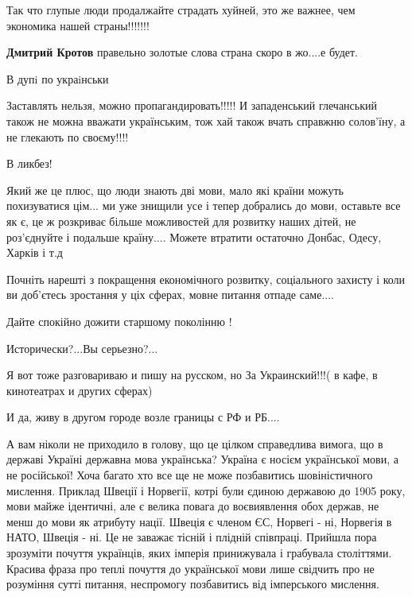 \begin{itemize}
Так что глупые люди продалжайте страдать хуйней, это же важнее, чем экономика
нашей страны!!!!!!!

\textbf{Дмитрий Кротов} правельно золотые слова страна скоро в жо....е будет.


В дупi по украiнськи

Заставлять нельзя, можно пропагандировать!!!!!
И западенський глечанський також не можна вважати українським, тож хай також вчать справжню солов'їну, а не глекають по своєму!!!!

В ликбез!


Який же це плюс, що люди знають дві мови, мало які країни можуть похизуватися
цім... ми уже знищили усе і тепер добрались до мови, оставьте все як є, це ж
розкриває більше можливостей для розвитку наших дітей, не роз'єднуйте і
подальше країну.... Можете втратити остаточно Донбас, Одесу, Харків і т.д

Почніть нарешті з покращення економічного розвитку, соціального захисту і коли
ви доб'єтесь зростання у ціх сферах, мовне питання отпаде саме....

Дайте спокійно дожити старшому поколінню !



Исторически?...Вы серьезно?...

Я вот тоже разговариваю и пишу на русском, но За Украинский!!!( в кафе, в
кинотеатрах и других сферах)

И да, живу в другом городе возле границы с РФ и РБ....


А вам ніколи не приходило в голову, що це цілком справедлива вимога, що в
державі Україні державна мова українська? Україна є носієм української мови, а
не російської! Хоча багато хто все ще не може позбавитись шовіністичного
мислення. Приклад Швеції і Норвегії, котрі були єдиною державою до 1905 року,
мови майже ідентичні, але є велика повага до воєвиявлення обох держав, не менш
до мови як атрибуту нації. Швеція є членом ЄС, Норвегі - ні, Норвегія в НАТО,
Швеція - ні. Це не заважає тісній і плідній співпраці. Прийшла пора зрозуміти
почуття українців, яких імперія принижувала і грабувала століттями. Красива
фраза про теплі почуття до української мови лише свідчить про не розуміння
сутті питання, неспромогу позбавитись від імперського мислення.

\begin{itemize}


\end{itemize}
\end{itemize}
